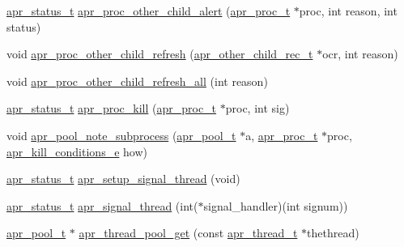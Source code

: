 \begin{DoxyCompactItemize}
\item 
\hyperlink{group__apr__errno_gaf76ee4543247e9fb3f3546203e590a6c}{apr\+\_\+status\+\_\+t} \hyperlink{group__apr__thread__proc_ga88701979c4e5ac4b94966c73e0159efd}{apr\+\_\+proc\+\_\+other\+\_\+child\+\_\+alert} (\hyperlink{structapr__proc__t}{apr\+\_\+proc\+\_\+t} $\ast$proc, int reason, int status)
\item 
void \hyperlink{group__apr__thread__proc_ga74a905d90a3476a611adeeb304931a6c}{apr\+\_\+proc\+\_\+other\+\_\+child\+\_\+refresh} (\hyperlink{group__apr__thread__proc_gafc52ee8b19a7b222278d31ebb3f11a71}{apr\+\_\+other\+\_\+child\+\_\+rec\+\_\+t} $\ast$ocr, int reason)
\item 
void \hyperlink{group__apr__thread__proc_gacff5e867a92619d30c4e78f9ad2a58e3}{apr\+\_\+proc\+\_\+other\+\_\+child\+\_\+refresh\+\_\+all} (int reason)
\item 
\hyperlink{group__apr__errno_gaf76ee4543247e9fb3f3546203e590a6c}{apr\+\_\+status\+\_\+t} \hyperlink{group__apr__thread__proc_ga4a5ff2fce2c68460281b0cb3ee0365d5}{apr\+\_\+proc\+\_\+kill} (\hyperlink{structapr__proc__t}{apr\+\_\+proc\+\_\+t} $\ast$proc, int sig)
\item 
void \hyperlink{group__apr__thread__proc_gacbe3fd9491fa35149de28cebcae22f87}{apr\+\_\+pool\+\_\+note\+\_\+subprocess} (\hyperlink{group__apr__pools_gaf137f28edcf9a086cd6bc36c20d7cdfb}{apr\+\_\+pool\+\_\+t} $\ast$a, \hyperlink{structapr__proc__t}{apr\+\_\+proc\+\_\+t} $\ast$proc, \hyperlink{group__apr__thread__proc_ga3eaec78633742e7e0cb9480a21477aff}{apr\+\_\+kill\+\_\+conditions\+\_\+e} how)
\item 
\hyperlink{group__apr__errno_gaf76ee4543247e9fb3f3546203e590a6c}{apr\+\_\+status\+\_\+t} \hyperlink{group__apr__thread__proc_ga7adc09cd24568666266edce81cfffbed}{apr\+\_\+setup\+\_\+signal\+\_\+thread} (void)
\item 
\hyperlink{group__apr__errno_gaf76ee4543247e9fb3f3546203e590a6c}{apr\+\_\+status\+\_\+t} \hyperlink{group__apr__thread__proc_ga2e53fa76ff725749c7affe6c81faa9e5}{apr\+\_\+signal\+\_\+thread} (int($\ast$signal\+\_\+handler)(int signum))
\item 
\hyperlink{group__apr__pools_gaf137f28edcf9a086cd6bc36c20d7cdfb}{apr\+\_\+pool\+\_\+t} $\ast$ \hyperlink{group__apr__thread__proc_ga089b70ae9d6c64d2675a1fd1e9cd0d0d}{apr\+\_\+thread\+\_\+pool\+\_\+get} (const \hyperlink{group__apr__thread__proc_ga646c71351e723d84f8cc8c8d1d5937be}{apr\+\_\+thread\+\_\+t} $\ast$thethread)
\end{DoxyCompactItemize}



